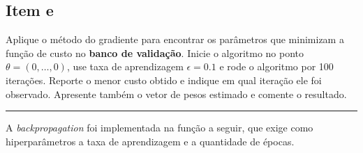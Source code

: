 \documentclass[
  a4paperpaper,
]{article}
\begin{document}
\subsection{Item e}\label{item-e}

Aplique o método do gradiente para encontrar os parâmetros que minimizam
a função de custo no \textbf{banco de validação}. Inicie o algoritmo no
ponto \(\theta = (0, \dots , 0)\), use taxa de aprendizagem
\(\epsilon = 0.1\) e rode o algoritmo por 100 iterações. Reporte o menor
custo obtido e indique em qual iteração ele foi observado. Apresente
também o vetor de pesos estimado e comente o resultado.

\begin{center}\rule{0.5\linewidth}{0.5pt}\end{center}

A \emph{backpropagation} foi implementada na função a seguir, que exige
como hiperparâmetros a taxa de aprendizagem e a quantidade de épocas.
\end{document}

